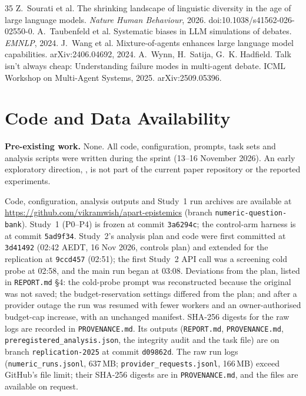 \documentclass[10pt]{article}
\theoremstyle{manuscript}\newtheorem{proposition}{Proposition}
\begin{document}
\begin{thebibliography}{35}
 Z.~Sourati et al. The shrinking landscape of linguistic diversity in the age of large language models. \emph{Nature Human Behaviour}, 2026. doi:10.1038/s41562-026-02550-0.
 A.~Taubenfeld et al. Systematic biases in LLM simulations of debates. \emph{EMNLP}, 2024.
 J.~Wang et al. Mixture-of-agents enhances large language model capabilities. arXiv:2406.04692, 2024.
 A.~Wynn, H.~Satija, G.~K. Hadfield. Talk isn't always cheap: Understanding failure modes in multi-agent debate. ICML Workshop on Multi-Agent Systems, 2025. arXiv:2509.05396.
\end{thebibliography}
\endgroup
\normalsize

\appendix
\clearpage
\section{Code and Data Availability}\label{app:code}
\textbf{Pre-existing work.} None. All code, configuration, prompts, task sets and analysis scripts were written during the sprint (13--16 November 2026). An early exploratory direction, , is not part of the current paper repository or the reported experiments.

Code, configuration, analysis outputs and Study~1 run archives are available at \url{https://github.com/vikramwish/apart-epistemics} (branch \texttt{numeric-question-bank}). Study~1 (P0--P4) is frozen at commit \texttt{3a6294c}; the control-arm harness is at commit \texttt{5ad9f34}. Study~2's analysis plan and code were first committed at \texttt{3d41492} (02:42 AEDT, 16 Nov 2026, controls plan) and extended for the replication at \texttt{9ccd457} (02:51); the first Study~2 API call was a screening cold probe at 02:58, and the main run began at 03:08. Deviations from the plan, listed in \texttt{REPORT.md} \S4: the cold-probe prompt was reconstructed because the original was not saved; the budget-reservation settings differed from the plan; and after a provider outage the run was resumed with fewer workers and an owner-authorised budget-cap increase, with an unchanged manifest. SHA-256 digests for the raw logs are recorded in \texttt{PROVENANCE.md}. Its outputs (\texttt{REPORT.md}, \texttt{PROVENANCE.md}, \texttt{preregistered\_analysis.json}, the integrity audit and the task file) are on branch \texttt{replication-2025} at commit \texttt{d09862d}. The raw run logs (\texttt{numeric\_runs.jsonl}, 637\,MB; \texttt{provider\_requests.jsonl}, 166\,MB) exceed GitHub's file limit; their SHA-256 digests are in \texttt{PROVENANCE.md}, and the files are available on request.
\end{document}
